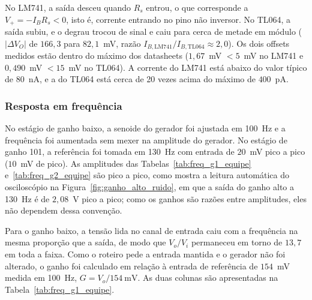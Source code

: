 \documentclass[11pt,a4paper]{article}
\begin{document}
No LM741, a saída desceu quando $R_s$ entrou, o que corresponde a $V_+=-I_B R_s<0$, isto é, corrente entrando no pino não inversor. No TL064, a saída subiu, e o degrau trocou de sinal e caiu para cerca de metade em módulo ($|\Delta V_O|$ de $166{,}3$ para $82{,}1$~mV, razão $I_{B,\mathrm{LM741}}/I_{B,\mathrm{TL064}}\approx2{,}0$). Os dois offsets medidos estão dentro do máximo dos datasheets ($1{,}67$~mV $<5$~mV no LM741 e $0{,}490$~mV $<15$~mV no TL064). A corrente do LM741 está abaixo do valor típico de $80$~nA, e a do TL064 está cerca de 20 vezes acima do máximo de $400$~pA.

\subsubsection{Resposta em frequência}

No estágio de ganho baixo, a senoide do gerador foi ajustada em 100~Hz e a frequência foi aumentada sem mexer na amplitude do gerador. No estágio de ganho 101, a referência foi tomada em 130~Hz com entrada de $20$~mV pico a pico ($10$~mV de pico). As amplitudes das Tabelas~\ref{tab:freq_g1_equipe} e~\ref{tab:freq_g2_equipe} são pico a pico, como mostra a leitura automática do osciloscópio na Figura~\ref{fig:ganho_alto_ruido}, em que a saída do ganho alto a 130~Hz é de $2{,}08$~V pico a pico; como os ganhos são razões entre amplitudes, eles não dependem dessa convenção.

Para o ganho baixo, a tensão lida no canal de entrada caiu com a frequência na mesma proporção que a saída, de modo que $V_o/V_i$ permaneceu em torno de $13{,}7$ em toda a faixa. Como o roteiro pede a entrada mantida e o gerador não foi alterado, o ganho foi calculado em relação à entrada de referência de $154$~mV medida em 100~Hz, $G=V_o/154~\mathrm{mV}$. As duas colunas são apresentadas na Tabela~\ref{tab:freq_g1_equipe}.
\end{document}

